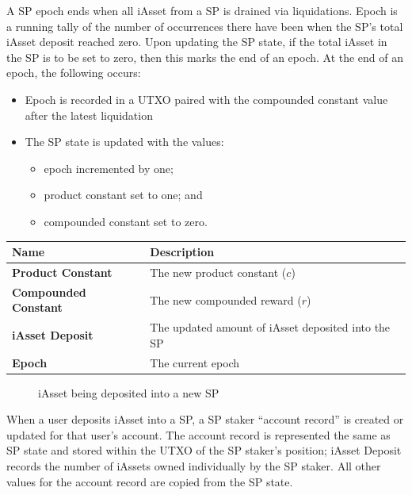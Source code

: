 \documentclass{article}
\begin{document}
\begin{sloppypar}
A SP epoch ends when all iAsset from a SP is drained via liquidations.
Epoch is a running tally of the number of occurrences there have been
when the SP's total iAsset deposit reached zero. Upon updating the SP
state, if the total iAsset in the SP is to be set to zero, then this
marks the end of an epoch. At the end of an epoch, the following occurs:

\begin{itemize}
\item
  Epoch is recorded in a UTXO paired with the compounded constant value
  after the latest liquidation
\item
  The SP state is updated with the values:

  \begin{itemize}
  \item
    epoch incremented by one;
  \item
    product constant set to one; and
  \item
    compounded constant set to zero.
  \end{itemize}
\end{itemize}

\hypertarget{stability-pool-state}{}

\begin{tabularx}{\linewidth}{l|l}
\caption{State stored upon updates to a SP}
\tabularnewline
\toprule
\textbf{Name} & \textbf{Description}
\tabularnewline
\midrule
\endhead
\textbf{Product Constant} & The new product constant
(\(c\))
\tabularnewline
\midrule
\textbf{Compounded Constant} & The new compounded reward
(\(r\))
\tabularnewline
\midrule
\textbf{iAsset Deposit} & The updated amount of iAsset deposited into
the SP
\tabularnewline
\midrule
\textbf{Epoch} & The current epoch
\tabularnewline
\bottomrule
\end{tabularx}

\hypertarget{stability-deposits}{%
\begin{figure}[htbp]
\centering

\caption{iAsset being deposited into a new SP}
\label{stability-deposits}
\end{figure}}

When a user deposits iAsset into a SP, a SP staker ``account record'' is
created or updated for that user's account. The account record is
represented the same as SP state and stored within the UTXO of the SP
staker's position; iAsset Deposit records the number of iAssets owned
individually by the SP staker. All other values for the account record
are copied from the SP state.


\end{sloppypar}
\end{document}
